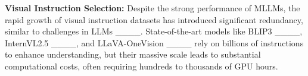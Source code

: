 \noindent
\textbf{Visual Instruction Selection:}  
Despite the strong performance of MLLMs, the rapid growth of visual instruction datasets has introduced significant redundancy, similar to challenges in LLMs ____. State-of-the-art models like BLIP3 ____, InternVL2.5 ____, and LLaVA-OneVision ____ rely on billions of instructions to enhance understanding, but their massive scale leads to substantial computational costs, often requiring hundreds to thousands of GPU hours.

